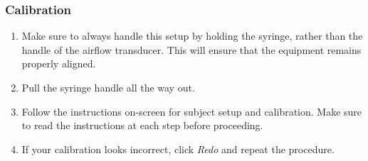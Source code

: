 \documentclass{article}
\begin{document}
\subsubsection*{Calibration}
\begin{enumerate}
	\item Make sure to always handle this setup by holding the syringe, rather than the handle of the airflow transducer. This will ensure that the equipment remains properly aligned.
	\item Pull the syringe handle all the way out.
	\item Follow the instructions on-screen for subject setup and calibration. Make sure to read the instructions at each step before proceeding.
	\item If your calibration looks incorrect, click \textit{Redo} and repeat the procedure.
\end{enumerate}
\end{document}

